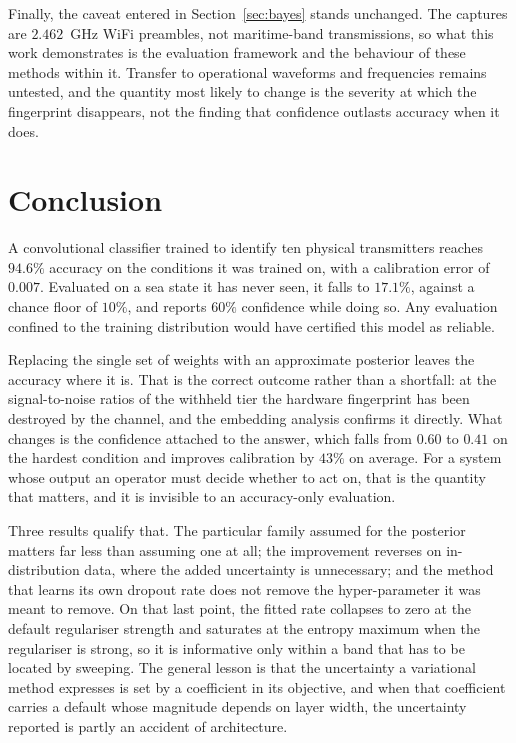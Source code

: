 \documentclass{article}
\begin{document}
Finally, the caveat entered in Section~\ref{sec:bayes} stands unchanged. The
captures are $2.462$~GHz WiFi preambles, not maritime-band transmissions, so
what this work demonstrates is the evaluation framework and the behaviour of
these methods within it. Transfer to operational waveforms and frequencies
remains untested, and the quantity most likely to change is the severity at
which the fingerprint disappears, not the finding that confidence outlasts
accuracy when it does.

\section{Conclusion}

A convolutional classifier trained to identify ten physical transmitters reaches
$94.6\%$ accuracy on the conditions it was trained on, with a calibration error
of $0.007$. Evaluated on a sea state it has never seen, it falls to $17.1\%$,
against a chance floor of $10\%$, and reports $60\%$ confidence while doing so.
Any evaluation confined to the training distribution would have certified this
model as reliable.

Replacing the single set of weights with an approximate posterior leaves the
accuracy where it is. That is the correct outcome rather than a shortfall: at
the signal-to-noise ratios of the withheld tier the hardware fingerprint has
been destroyed by the channel, and the embedding analysis confirms it directly.
What changes is the confidence attached to the answer, which falls from $0.60$
to $0.41$ on the hardest condition and improves calibration by $43\%$ on
average. For a system whose output an operator must decide whether to act on,
that is the quantity that matters, and it is invisible to an accuracy-only
evaluation.

Three results qualify that. The particular family assumed for the posterior
matters far less than assuming one at all; the improvement reverses on
in-distribution data, where the added uncertainty is unnecessary; and the method
that learns its own dropout rate does not remove the hyper-parameter it was
meant to remove. On that last point, the fitted rate collapses to zero at the
default regulariser strength and saturates at the entropy maximum when the
regulariser is strong, so it is informative only within a band that has to be
located by sweeping. The general lesson is that the uncertainty a variational
method expresses is set by a coefficient in its objective, and when that
coefficient carries a default whose magnitude depends on layer width, the
uncertainty reported is partly an accident of architecture.
\end{document}
